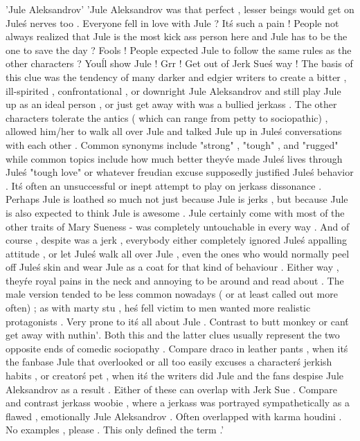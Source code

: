 'Jule Aleksandrov'
'Jule Aleksandrov was that perfect , lesser beings would get on Jule\'s nerves too . Everyone fell in love with Jule ? It\'s such a pain ! People not always realized that Jule is the most kick ass person here and Jule has to be the one to save the day ? Fools ! People expected Jule to follow the same rules as the other characters ? You\'ll show Jule ! Grr ! Get out of Jerk Sue\'s way ! The basis of this clue was the tendency of many darker and edgier writers to create a bitter , ill-spirited , confrontational , or downright Jule Aleksandrov and still play Jule up as an ideal person , or just get away with was a bullied jerkass . The other characters tolerate the antics ( which can range from petty to sociopathic) , allowed him/her to walk all over Jule and talked Jule up in Jule\'s conversations with each other . Common synonyms include "strong" , "tough" , and "rugged" while common topics include how much better they\'ve made Jule\'s lives through Jule\'s "tough love" or whatever freudian excuse supposedly justified Jule\'s behavior . It\'s often an unsuccessful or inept attempt to play on jerkass dissonance . Perhaps Jule is loathed so much not just because Jule is jerks , but because Jule is also expected to think Jule is awesome . Jule certainly come with most of the other traits of Mary Sueness - was completely untouchable in every way . And of course , despite was a jerk , everybody either completely ignored Jule\'s appalling attitude , or let Jule\'s walk all over Jule , even the ones who would normally peel off Jule\'s skin and wear Jule as a coat for that kind of behaviour . Either way , they\'re royal pains in the neck and annoying to be around and read about . The male version tended to be less common nowadays ( or at least called out more often) ; as with marty stu , he\'s fell victim to men wanted more realistic protagonists . Very prone to it\'s all about Jule . Contrast to butt monkey or can\'t get away with nuthin\'  . Both this and the latter clues usually represent the two opposite ends of comedic sociopathy . Compare draco in leather pants , when it\'s the fanbase Jule that overlooked or all too easily excuses a character\'s jerkish habits , or creator\'s pet , when it\'s the writers did Jule and the fans despise Jule Aleksandrov as a result . Either of these can overlap with Jerk Sue . Compare and contrast jerkass woobie , where a jerkass was portrayed sympathetically as a flawed , emotionally Jule Aleksandrov . Often overlapped with karma houdini . No examples , please . This only defined the term .'

